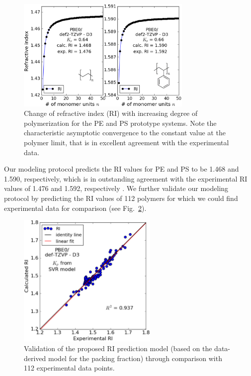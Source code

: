 \begin{figure}[htbp] 
	\centering
	\includegraphics[width=0.75\textwidth]{Chapter-2/Figures/plot_RI.eps}
	\caption{Change of refractive index (RI) with increasing degree of polymerization for the PE and PS prototype systems. Note the characteristic asymptotic convergence to the constant value at the polymer limit, that is in excellent agreement with the experimental data.} 
	\label{fig:RI_ex} 
\end{figure}  


Our modeling protocol predicts the RI values for PE and PS to be 1.468 and 1.590, respectively, which is in outstanding agreement with the experimental RI values of 1.476 and 1.592, respectively \cite{Bicerano2002}.
We further validate our modeling protocol by predicting the RI values of 112 polymers for which we could find experimental data for comparison (see Fig.\ \ref{fig:validation}). 



\begin{figure}[hbpt] 
	\centering
	\includegraphics[width=0.6\textwidth]{Chapter-2/Figures/PBE0_Kp_ML.eps}
	\caption{Validation of the proposed RI prediction model (based on the data-derived model for the packing fraction) through comparison with 112 experimental data points.	
	} 
	\label{fig:validation} 
\end{figure} 


